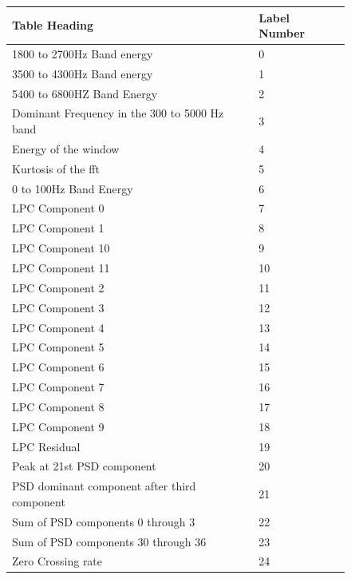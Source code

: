 \documentclass[ %
                    author={Sam Phippen},
                supervisor={Dr. Rafal Bogacz},
                     title={Real time voice activity detectors in noisy personal computing environments},
                  subtitle={},
                    degree={MEng},
                      year={2012} ]{thesis}
\begin{document}
\begin{figure}
    \begin{center}
        \begin{tabular}{ |l|l| }
            \hline
            Table Heading                                 & Label Number \\ \hline
            1800 to 2700Hz Band energy                    & 0 \\ \hline
            3500 to 4300Hz Band energy                    & 1 \\ \hline
            5400 to 6800HZ Band Energy                    & 2 \\ \hline
            Dominant Frequency in the 300 to 5000 Hz band & 3 \\ \hline
            Energy of the window                          & 4 \\ \hline
            Kurtosis of the fft                           & 5 \\ \hline
            0 to 100Hz Band Energy                        & 6 \\ \hline
            LPC Component 0                               & 7 \\ \hline
            LPC Component 1                               & 8 \\ \hline
            LPC Component 10                              & 9 \\ \hline
            LPC Component 11                              & 10 \\ \hline
            LPC Component 2                               & 11 \\ \hline
            LPC Component 3                               & 12 \\ \hline
            LPC Component 4                               & 13 \\ \hline
            LPC Component 5                               & 14 \\ \hline
            LPC Component 6                               & 15 \\ \hline
            LPC Component 7                               & 16 \\ \hline
            LPC Component 8                               & 17 \\ \hline
            LPC Component 9                               & 18 \\ \hline
            LPC Residual                                  & 19 \\ \hline
            Peak at 21st PSD component                    & 20 \\ \hline
            PSD dominant component after third component  & 21 \\ \hline
            Sum of PSD components 0 through 3             & 22 \\ \hline
            Sum of PSD components 30 through 36           & 23 \\ \hline
            Zero Crossing rate                            & 24 \\ \hline
        \end{tabular}
    \end{center}


\end{figure}
\end{document}
